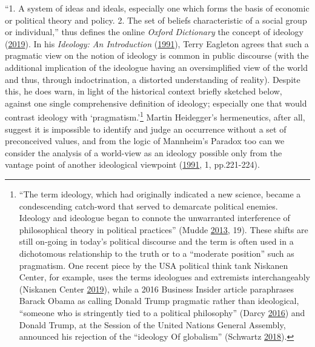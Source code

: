 \documentclass[10pt,british,A4paper,oneside]{memoir}
\begin{document}
``1. A system of ideas and ideals, especially one which forms the basis
of economic or political theory and policy. 2. The set of beliefs
characteristic of a social group or individual,'' thus defines the
online \emph{Oxford Dictionary} the concept of ideology
(\protect\hyperlink{ref-oxforddictionaries.com_ideology_2019}{2019}). In
his \emph{Ideology: An Introduction}
(\protect\hyperlink{ref-eagleton_ideology:_1991}{1991}), Terry Eagleton
agrees that such a pragmatic view on the notion of ideology is common in
public discourse (with the additional implication of the ideologue
having an oversimplified view of the world and thus, through
indoctrination, a distorted understanding of reality). Despite this, he
does warn, in light of the historical context briefly sketched below,
against one single comprehensive definition of ideology; especially one
that would contrast ideology with `pragmatism.'\footnote{``The term
  ideology, which had originally indicated a new science, became a
  condescending catch-word that served to demarcate political enemies.
  Ideology and ideologue began to connote the unwarranted interference
  of philosophical theory in political practices'' (Mudde
  \protect\hyperlink{ref-mudde_oxford_2013}{2013}, 19). These shifts
  are still on-going in today's political discourse and the term is
  often used in a dichotomous relationship to the truth or to a
  ``moderate position'' such as pragmatism. One recent piece by the USA
  political think tank Niskanen Center, for example, uses the terms
  ideologues and extremists interchangeably (Niskanen Center
  \protect\hyperlink{ref-niskanen_center_if_2019}{2019}), while a 2016
  Business Insider article paraphrases Barack Obama as calling Donald
  Trump pragmatic rather than ideological, ``someone who is stringently
  tied to a political philosophy'' (Darcy
  \protect\hyperlink{ref-darcy_obama_2016}{2016}) and Donald Trump, at
  the  Session of the United Nations General Assembly, announced his
  rejection of the ``ideology Of globalism'' (Schwartz
  \protect\hyperlink{ref-schwartz_trump_2018}{2018}).} Martin
Heidegger's hermeneutics, after all, suggest it is impossible to
identify and judge an occurrence without a set of preconceived values,
and from the logic of Mannheim's Paradox too can we consider the
analysis of a world-view as an ideology possible only from the vantage
point of another ideological viewpoint
(\protect\hyperlink{ref-eagleton_ideology:_1991}{1991}, 1, pp.221-224).
\end{document}
